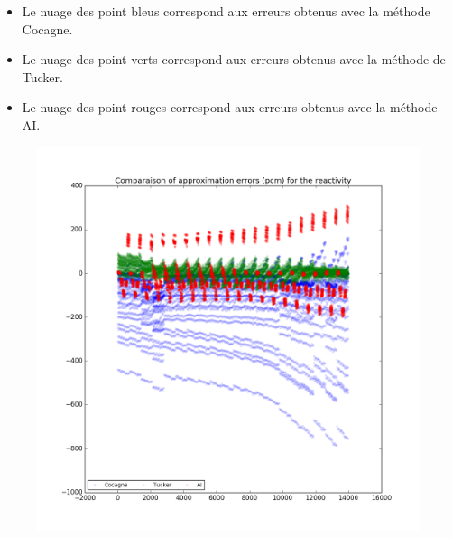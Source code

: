 \begin{itemize}
\item Le nuage des point bleus correspond aux erreurs obtenus avec la méthode Cocagne.
\item Le nuage des point verts correspond aux erreurs obtenus avec la méthode de Tucker.
\item Le nuage des point rouges correspond aux erreurs obtenus avec la méthode AI.
\end{itemize}
\begin{center}
\begin{figure}[h]
   \begin{minipage}[b]{0.32\linewidth}
      \centering \includegraphics[scale=0.2]{images/MOX/ReactivityError.png}
   \end{minipage}
   \begin{minipage}[b]{0.32\linewidth}

\end{minipage}
\end{figure}
\end{center}

